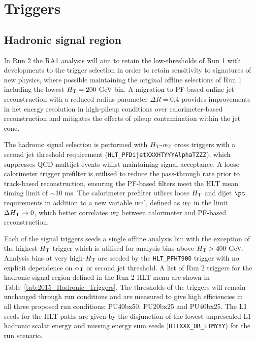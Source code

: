 \section{Triggers}
\label{sec:triggers}


\subsection{Hadronic signal region}


In Run 2 the RA1 analysis will aim to retain the low-thresholds of Run 1 with developments to the trigger selection in order to retain sensitivity to signatures of new physics, where possible maintaining the original offline selections of Run 1 including the lowest $\mbox{$H_\text{T}$} = 200$ GeV bin. A migration to PF-based online jet reconstruction with a reduced radius parameter $\Delta R = 0.4$ provides improvements in het energy resolution in high-pileup conditions over calorimeter-based reconstruction and mitigates the effects of pileup contamination within the jet cone.

The hadronic signal selection is performed with $\mbox{$H_\text{T}$}$-$\alpha_{\text{T}}$ cross triggers with a second jet threshold requirement (\verb!HLT_PFDijetXXXHTYYYAlphaTZZZ!), which suppresses QCD multijet events whilst maintaining signal acceptance.  A loose calorimeter trigger prefilter is utilised to reduce the pass-through rate prior to track-based reconstruction, ensuring the PF-based filters meet the HLT mean timing limit of $\sim$10 ms. The calorimeter prefilter utlises loose $\mbox{$H_\text{T}$}$ and dijet $\pt$ requirements in addition to a new variable $\alpha_{\text{T}}$', defined as $\alpha_{\text{T}}$ in the limit $\Delta\mbox{$H_\text{T}$} \rightarrow 0$, which better correlates $\alpha_{\text{T}}$ between calorimeter and PF-based reconstruction.

Each of the signal triggers seeds a single offline analysis bin with the exception of the highest-$\mbox{$H_\text{T}$}$ trigger which is utilised for analysis bins above $\mbox{$H_\text{T}$} > 400$ GeV. Analysis bins at very high-$\mbox{$H_\text{T}$}$ are seeded by the \verb!HLT_PFHT900! trigger with no explicit dependence on $\alpha_{\text{T}}$ or second jet threshold. A list of Run 2 triggers for the hadronic signal region defined in the Run 2 HLT menu are shown in Table~\ref{tab:2015_Hadronic_Triggers}. The thresholds of the triggers will remain unchanged through run conditions and are measured to give high efficiencies in all three proposed run conditions: PU40bx50, PU20bx25 and PU40bx25. The L1 seeds for the HLT paths are given by the disjunction of the lowest unprescaled L1 hadronic scalar energy and missing energy sum seeds (\verb!HTTXXX_OR_ETMYYY!) for the run scenario.



